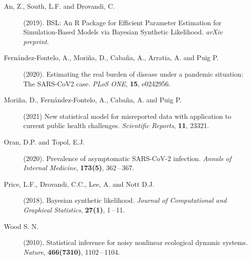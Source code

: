 \documentclass[twoside]{report}
\begin{document}



\begin{description}

\item[An, Z., South, L.F. and Drovandi, C.] (2019). BSL: An R Package for Efficient Parameter
  Estimation for Simulation-Based Models via Bayesian Synthetic Likelihood.
  {\it arXiv preprint}.

\item[Fern{\'{a}}ndez-Fontelo, A., Mori{\~{n}}a, D., Caba{\~{n}}a, A., Arratia, A. and Puig P.] (2020).
  Estimating the real burden of disease under a pandemic situation: The
  SARS-CoV2 case. {\it PLoS ONE}, {\bf 15}, e0242956.

\item[Mori{\~{n}}a, D., Fern{\'{a}}ndez-Fontelo, A., Caba{\~{n}}a, A. and Puig P.] (2021) New
  statistical model for misreported data with application to current public
  health challenges. {\it Scientific Reports}, {\bf 11}, 23321.

\item[Oran, D.P. and Topol, E.J.] (2020). Prevalence of asymptomatic SARS-CoV-2 infection. {\it
  Annals of Internal Medicine}, {\bf 173(5)}, 362\,--\,367.

\item[Price, L.F., Drovandi, C.C., Lee, A. and Nott D.J.] (2018). Bayesian synthetic likelihood. {\it
  Journal of Computational and Graphical Statistics}, {\bf 27(1)},
  1\,--\,11.

\item[Wood S. N.] (2010). Statistical inference for noisy nonlinear ecological dynamic
  systems. {\it Nature}, {\bf 466(7310)}, 1102\,--\,1104.

\end{description}
\end{document}
